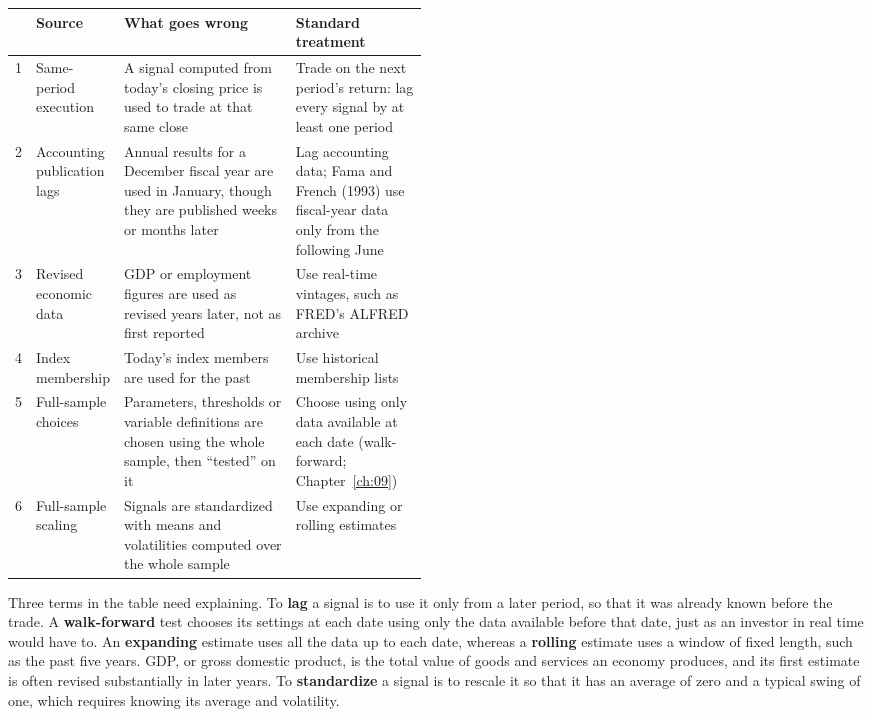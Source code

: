 \begin{center}
\small
\begin{tabularx}{0.9\linewidth}{@{}r>{\raggedright\arraybackslash}p{0.16\linewidth}>{\raggedright\arraybackslash}X>{\raggedright\arraybackslash}p{0.32\linewidth}@{}}
\toprule
 & Source & What goes wrong & Standard treatment \\
\midrule
1 & Same-period execution & A signal computed from today's closing price is used to trade at that same close & Trade on the next period's return: lag every signal by at least one period \\
2 & Accounting publication lags & Annual results for a December fiscal year are used in January, though they are published weeks or months later & Lag accounting data; Fama and French (1993) use fiscal-year data only from the following June \\
3 & Revised economic data & GDP or employment figures are used as revised years later, not as first reported & Use real-time vintages, such as FRED's ALFRED archive \\
4 & Index membership & Today's index members are used for the past & Use historical membership lists \\
5 & Full-sample choices & Parameters, thresholds or variable definitions are chosen using the whole sample, then ``tested'' on it & Choose using only data available at each date (walk-forward; Chapter~\ref{ch:09}) \\
6 & Full-sample scaling & Signals are standardized with means and volatilities computed over the whole sample & Use expanding or rolling estimates \\
\bottomrule
\end{tabularx}
\end{center}


Three terms in the table need explaining. To \textbf{lag} a signal is to use it only from a later period, so that it was already known before the trade. A \textbf{walk-forward} test chooses its settings at each date using only the data available before that date, just as an investor in real time would have to. An \textbf{expanding} estimate uses all the data up to each date, whereas a \textbf{rolling} estimate uses a window of fixed length, such as the past five years. GDP, or gross domestic product, is the total value of goods and services an economy produces, and its first estimate is often revised substantially in later years. To \textbf{standardize} a signal is to rescale it so that it has an average of zero and a typical swing of one, which requires knowing its average and volatility.

